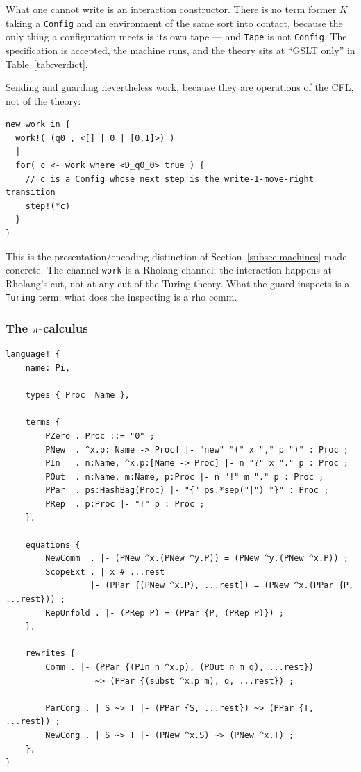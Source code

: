 \documentclass[11pt]{article}
\theoremstyle{definition}
\theoremstyle{plain}
\theoremstyle{remark}
\begin{document}
What one cannot write is an interaction constructor. There is no term former $K$ taking a
\texttt{Config} and an environment of the same sort into contact, because the only thing
a configuration meets is its own tape --- and \texttt{Tape} is not \texttt{Config}. The
specification is accepted, the machine runs, and the theory sits at ``GSLT only'' in
Table~\ref{tab:verdict}.

Sending and guarding nevertheless work, because they are operations of the CFL, not of the
theory:

\begin{lstlisting}
new work in {
  work!( (q0 , <[] | 0 | [0,1]>) )
  |
  for( c <- work where <D_q0_0> true ) {
    // c is a Config whose next step is the write-1-move-right transition
    step!(*c)
  }
}
\end{lstlisting}

This is the presentation/encoding distinction of Section~\ref{subsec:machines} made
concrete. The channel \texttt{work} is a Rholang channel; the interaction happens at
Rholang's cut, not at any cut of the Turing theory. What the guard inspects is a
\texttt{Turing} term; what does the inspecting is a rho comm.

\subsubsection{The \texorpdfstring{$\pi$}{pi}-calculus}

\begin{lstlisting}
language! {
    name: Pi,

    types { Proc  Name },

    terms {
        PZero . Proc ::= "0" ;
        PNew  . ^x.p:[Name -> Proc] |- "new" "(" x "," p ")" : Proc ;
        PIn   . n:Name, ^x.p:[Name -> Proc] |- n "?" x "." p : Proc ;
        POut  . n:Name, m:Name, p:Proc |- n "!" m "." p : Proc ;
        PPar  . ps:HashBag(Proc) |- "{" ps.*sep("|") "}" : Proc ;
        PRep  . p:Proc |- "!" p : Proc ;
    },

    equations {
        NewComm  . |- (PNew ^x.(PNew ^y.P)) = (PNew ^y.(PNew ^x.P)) ;
        ScopeExt . | x # ...rest
                 |- (PPar {(PNew ^x.P), ...rest}) = (PNew ^x.(PPar {P, ...rest})) ;
        RepUnfold . |- (PRep P) = (PPar {P, (PRep P)}) ;
    },

    rewrites {
        Comm . |- (PPar {(PIn n ^x.p), (POut n m q), ...rest})
                  ~> (PPar {(subst ^x.p m), q, ...rest}) ;

        ParCong . | S ~> T |- (PPar {S, ...rest}) ~> (PPar {T, ...rest}) ;
        NewCong . | S ~> T |- (PNew ^x.S) ~> (PNew ^x.T) ;
    },
}
\end{lstlisting}
\end{document}
